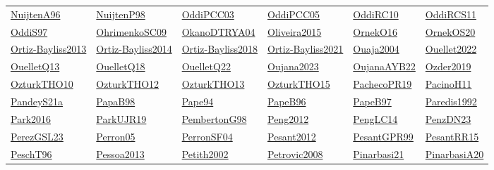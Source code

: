 \begin{longtable}{*{6}{l}}
\hyperref[detail:NuijtenA96]{NuijtenA96} & \hyperref[detail:NuijtenP98]{NuijtenP98} & \hyperref[detail:OddiPCC03]{OddiPCC03} & \hyperref[detail:OddiPCC05]{OddiPCC05} & \hyperref[detail:OddiRC10]{OddiRC10} & \hyperref[detail:OddiRCS11]{OddiRCS11}\\ 
\hyperref[detail:OddiS97]{OddiS97} & \hyperref[detail:OhrimenkoSC09]{OhrimenkoSC09} & \hyperref[detail:OkanoDTRYA04]{OkanoDTRYA04} & \hyperref[detail:Oliveira2015]{Oliveira2015} & \hyperref[detail:OrnekO16]{OrnekO16} & \hyperref[detail:OrnekOS20]{OrnekOS20}\\ 
\hyperref[detail:Ortiz-Bayliss2013]{Ortiz-Bayliss2013} & \hyperref[detail:Ortiz-Bayliss2014]{Ortiz-Bayliss2014} & \hyperref[detail:Ortiz-Bayliss2018]{Ortiz-Bayliss2018} & \hyperref[detail:Ortiz-Bayliss2021]{Ortiz-Bayliss2021} & \hyperref[detail:Ouaja2004]{Ouaja2004} & \hyperref[detail:Ouellet2022]{Ouellet2022}\\ 
\hyperref[detail:OuelletQ13]{OuelletQ13} & \hyperref[detail:OuelletQ18]{OuelletQ18} & \hyperref[detail:OuelletQ22]{OuelletQ22} & \hyperref[detail:Oujana2023]{Oujana2023} & \hyperref[detail:OujanaAYB22]{OujanaAYB22} & \hyperref[detail:Ozder2019]{Ozder2019}\\ 
\hyperref[detail:OzturkTHO10]{OzturkTHO10} & \hyperref[detail:OzturkTHO12]{OzturkTHO12} & \hyperref[detail:OzturkTHO13]{OzturkTHO13} & \hyperref[detail:OzturkTHO15]{OzturkTHO15} & \hyperref[detail:PachecoPR19]{PachecoPR19} & \hyperref[detail:PacinoH11]{PacinoH11}\\ 
\hyperref[detail:PandeyS21a]{PandeyS21a} & \hyperref[detail:PapaB98]{PapaB98} & \hyperref[detail:Pape94]{Pape94} & \hyperref[detail:PapeB96]{PapeB96} & \hyperref[detail:PapeB97]{PapeB97} & \hyperref[detail:Paredis1992]{Paredis1992}\\ 
\hyperref[detail:Park2016]{Park2016} & \hyperref[detail:ParkUJR19]{ParkUJR19} & \hyperref[detail:PembertonG98]{PembertonG98} & \hyperref[detail:Peng2012]{Peng2012} & \hyperref[detail:PengLC14]{PengLC14} & \hyperref[detail:PenzDN23]{PenzDN23}\\ 
\hyperref[detail:PerezGSL23]{PerezGSL23} & \hyperref[detail:Perron05]{Perron05} & \hyperref[detail:PerronSF04]{PerronSF04} & \hyperref[detail:Pesant2012]{Pesant2012} & \hyperref[detail:PesantGPR99]{PesantGPR99} & \hyperref[detail:PesantRR15]{PesantRR15}\\ 
\hyperref[detail:PeschT96]{PeschT96} & \hyperref[detail:Pessoa2013]{Pessoa2013} & \hyperref[detail:Petith2002]{Petith2002} & \hyperref[detail:Petrovic2008]{Petrovic2008} & \hyperref[detail:Pinarbasi21]{Pinarbasi21} & \hyperref[detail:PinarbasiA20]{PinarbasiA20}\\ 

\end{longtable}
